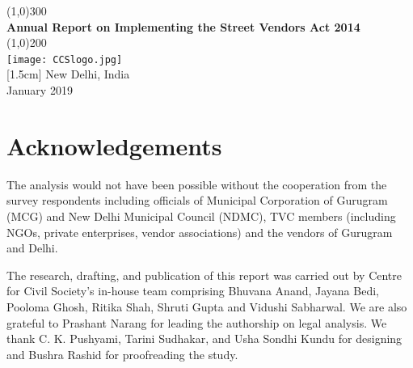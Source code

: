 \documentclass[a4paper, 12pt, twoside]{article}
\begin{document}
\newpage

\begin{titlepage}
\begin{center}
\line(1,0){300}\\
[0.25in]
\huge{\bfseries \textcolor{CCSbrown} {Annual Report on Implementing the Street Vendors Act 2014}} \\
[0.5cm]
\line(1,0){200}\\
[2in]
\texttt{[image: CCSlogo.jpg]} \\
[1.5cm]
[1.5cm]
{\Large New Delhi, India} \\
{\Large January 2019} \\
[1.85cm]


\end{center}
\end{titlepage}

\section*{Acknowledgements}


The analysis would not have been possible without the cooperation from the survey respondents including officials of Municipal Corporation of Gurugram (MCG) and New Delhi Municipal Council (NDMC), TVC members (including NGOs, private enterprises, vendor associations) and the vendors of Gurugram and Delhi.


The research, drafting, and publication of this report was carried out by Centre for Civil Society’s in-house team comprising Bhuvana Anand, Jayana Bedi, Pooloma Ghosh, Ritika Shah, Shruti Gupta and Vidushi Sabharwal. We are also grateful to Prashant Narang for leading the authorship on legal analysis. We thank C. K. Pushyami, Tarini Sudhakar, and Usha Sondhi Kundu for designing and Bushra Rashid for proofreading the study.


\newpage

\newpage
{}
\end{document}
